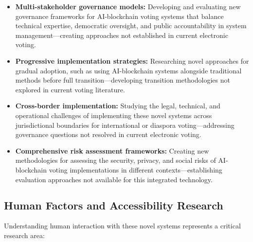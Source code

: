 \documentclass[conference]{IEEEtran}
\begin{document}
\begin{itemize}
    \item \textbf{Multi-stakeholder governance models:} Developing and evaluating new governance frameworks for AI-blockchain voting systems that balance technical expertise, democratic oversight, and public accountability in system management—creating approaches not established in current electronic voting.
    
    \item \textbf{Progressive implementation strategies:} Researching novel approaches for gradual adoption, such as using AI-blockchain systems alongside traditional methods before full transition—developing transition methodologies not explored in current voting literature.
    
    \item \textbf{Cross-border implementation:} Studying the legal, technical, and operational challenges of implementing these novel systems across jurisdictional boundaries for international or diaspora voting—addressing governance questions not resolved in current electronic voting.
    
    \item \textbf{Comprehensive risk assessment frameworks:} Creating new methodologies for assessing the security, privacy, and social risks of AI-blockchain voting implementations in different contexts—establishing evaluation approaches not available for this integrated technology.
\end{itemize}

\subsection{Human Factors and Accessibility Research}
Understanding human interaction with these novel systems represents a critical research area:
\end{document}
